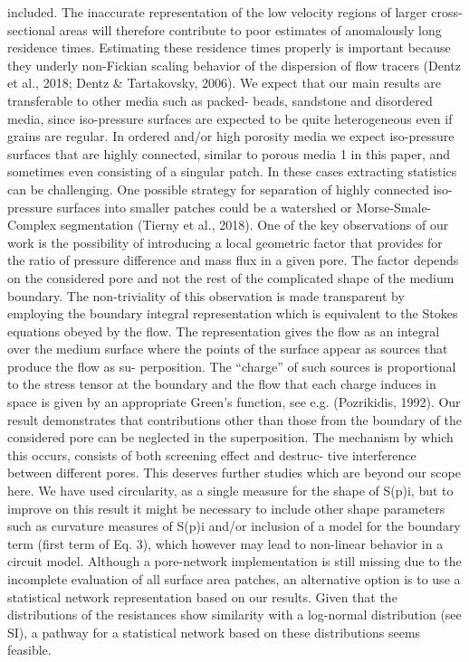 included. The inaccurate representation of the low velocity regions of larger cross-sectional areas will therefore contribute to poor estimates of anomalously long residence times. Estimating these residence times properly is important because they underly non-Fickian scaling behavior of the dispersion of flow tracers (Dentz et al., 2018; Dentz & Tartakovsky, 2006).
We expect that our main results are transferable to other media such as packed- beads, sandstone and disordered media, since iso-pressure surfaces are expected to be quite heterogeneous even if grains are regular. In ordered and/or high porosity media
we expect iso-pressure surfaces that are highly connected, similar to porous media 1 in this paper, and sometimes even consisting of a singular patch. In these cases extracting statistics can be challenging. One possible strategy for separation of highly connected iso-pressure surfaces into smaller patches could be a watershed or Morse-Smale-Complex segmentation (Tierny et al., 2018).
One of the key observations of our work is the possibility of introducing a local geometric factor that provides for the ratio of pressure difference and mass flux in a given pore. The factor depends on the considered pore and not the rest of the complicated shape of the medium boundary. The non-triviality of this observation is made transparent by employing the boundary integral representation which is equivalent to the Stokes equations obeyed by the flow. The representation gives the flow as an integral over the medium surface where the points of the surface appear as sources that produce the flow as su- perposition. The “charge” of such sources is proportional to the stress tensor at the boundary and the flow that each charge induces in space is given by an appropriate Green’s function, see e.g. (Pozrikidis, 1992). Our result demonstrates that contributions other
than those from the boundary of the considered pore can be neglected in the superposition. The mechanism by which this occurs, consists of both screening effect and destruc- tive interference between different pores. This deserves further studies which are beyond our scope here. We have used circularity, as a single measure for the shape of S(p)i, but
to improve on this result it might be necessary to include other shape parameters such
as curvature measures of S(p)i and/or inclusion of a model for the boundary term (first term of Eq. 3), which however may lead to non-linear behavior in a circuit model.
Although a pore-network implementation is still missing due to the incomplete evaluation of all surface area patches, an alternative option is to use a statistical network representation based on our results. Given that the distributions of the resistances show similarity with a log-normal distribution (see SI), a pathway for a statistical network based on these distributions seems feasible.
